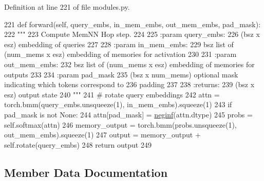 Definition at line 221 of file modules.\+py.


\begin{DoxyCode}
221     \textcolor{keyword}{def }forward(self, query\_embs, in\_mem\_embs, out\_mem\_embs, pad\_mask):
222         \textcolor{stringliteral}{"""}
223 \textcolor{stringliteral}{        Compute MemNN Hop step.}
224 \textcolor{stringliteral}{}
225 \textcolor{stringliteral}{        :param query\_embs:}
226 \textcolor{stringliteral}{            (bsz x esz) embedding of queries}
227 \textcolor{stringliteral}{}
228 \textcolor{stringliteral}{        :param in\_mem\_embs:}
229 \textcolor{stringliteral}{            bsz list of (num\_mems x esz) embedding of memories for activation}
230 \textcolor{stringliteral}{}
231 \textcolor{stringliteral}{        :param out\_mem\_embs:}
232 \textcolor{stringliteral}{            bsz list of (num\_mems x esz) embedding of memories for outputs}
233 \textcolor{stringliteral}{}
234 \textcolor{stringliteral}{        :param pad\_mask}
235 \textcolor{stringliteral}{            (bsz x num\_mems) optional mask indicating which tokens correspond to}
236 \textcolor{stringliteral}{            padding}
237 \textcolor{stringliteral}{}
238 \textcolor{stringliteral}{        :returns:}
239 \textcolor{stringliteral}{            (bsz x esz) output state}
240 \textcolor{stringliteral}{        """}
241         \textcolor{comment}{# rotate query embeddings}
242         attn = torch.bmm(query\_embs.unsqueeze(1), in\_mem\_embs).squeeze(1)
243         \textcolor{keywordflow}{if} pad\_mask \textcolor{keywordflow}{is} \textcolor{keywordflow}{not} \textcolor{keywordtype}{None}:
244             attn[pad\_mask] = \hyperlink{namespaceparlai_1_1utils_1_1torch_a6c6e25115353dba479cd72dc31dc76ae}{neginf}(attn.dtype)
245         probs = self.softmax(attn)
246         memory\_output = torch.bmm(probs.unsqueeze(1), out\_mem\_embs).squeeze(1)
247         output = memory\_output + self.rotate(query\_embs)
248         \textcolor{keywordflow}{return} output
249 \end{DoxyCode}


\subsection{Member Data Documentation}
\mbox{\label{classparlai_1_1agents_1_1memnn_1_1modules_1_1Hop_a88857c10815bc48ef24c78ecf367935d}} 
